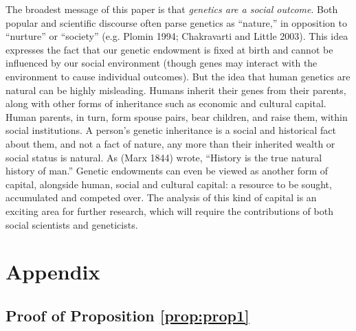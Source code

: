\documentclass[
]{article}
\begin{document}
The broadest message of this paper is that \emph{genetics are a social
outcome}. Both popular and scientific discourse often parse genetics as
``nature,'' in opposition to ``nurture'' or ``society'' (e.g. Plomin 1994; Chakravarti and Little 2003). This idea expresses the
fact that our genetic endowment is fixed at birth and cannot be
influenced by our social environment (though genes may interact with the
environment to cause individual outcomes). But the idea that human
genetics are natural can be highly misleading. Humans inherit their
genes from their parents, along with other forms of inheritance such as
economic and cultural capital. Human parents, in turn, form spouse
pairs, bear children, and raise them, within social institutions. A
person's genetic inheritance is a social and historical fact about them,
and not a fact of nature, any more than their inherited wealth or social
status is natural. As (Marx 1844) wrote, ``History is the true
natural history of man.'' Genetic endowments can even be viewed as
another form of capital, alongside human, social and cultural capital: a
resource to be sought, accumulated and competed over. The analysis of
this kind of capital is an exciting area for further research, which
will require the contributions of both social scientists and
geneticists.

\FloatBarrier

\newpage

\hypertarget{appendix}{%
\section{Appendix}\label{appendix}}

\hypertarget{proof-of-proposition-refpropprop1}{%
\subsection{Proof of Proposition \ref{prop:prop1}}\label{proof-of-proposition-refpropprop1}}
\end{document}
